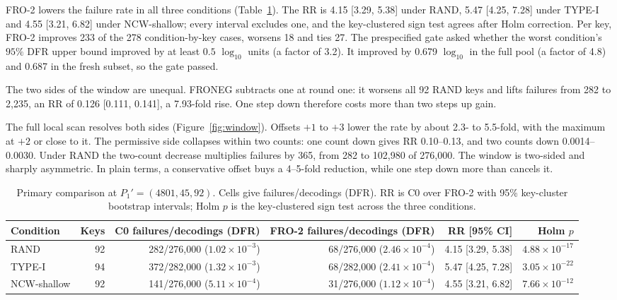 \documentclass[letterpaper,journal]{IEEEtran}
\begin{document}
FRO-2 lowers the failure rate in all three conditions (Table~\ref{tab:main}). The RR is 4.15 [3.29, 5.38] under RAND, 5.47 [4.25, 7.28] under TYPE-I and 4.55 [3.21, 6.82] under NCW-shallow; every interval excludes one, and the key-clustered sign test agrees after Holm correction. Per key, FRO-2 improves 233 of the 278 condition-by-key cases, worsens 18 and ties 27. The prespecified gate asked whether the worst condition's $95\%$ DFR upper bound improved by at least $0.5$ $\log_{10}$ units (a factor of 3.2). It improved by 0.679 $\log_{10}$ in the full pool (a factor of 4.8) and 0.687 in the fresh subset, so the gate passed.

The two sides of the window are unequal. FRONEG subtracts one at round one: it worsens all 92 RAND keys and lifts failures from 282 to 2{,}235, an RR of 0.126 [0.111, 0.141], a 7.93-fold rise. One step down therefore costs more than two steps up gain.

The full local scan resolves both sides (Figure~\ref{fig:window}). Offsets $+1$ to $+3$ lower the rate by about 2.3- to 5.5-fold, with the maximum at $+2$ or close to it. The permissive side collapses within two counts: one count down gives RR 0.10--0.13, and two counts down 0.0014--0.0030. Under RAND the two-count decrease multiplies failures by 365, from 282 to 102{,}980 of 276{,}000. The window is two-sided and sharply asymmetric. In plain terms, a conservative offset buys a 4--5-fold reduction, while one step down more than cancels it.

\begin{table}[!t]
\centering
\small
\caption{Primary comparison at $P_1'=(4801,45,92)$. Cells give failures/decodings (DFR). RR is C0 over FRO-2 with 95\% key-cluster bootstrap intervals; Holm $p$ is the key-clustered sign test across the three conditions.}
\label{tab:main}
\begin{tabular}{l r r r r r}
\toprule
Condition & Keys & C0 failures/decodings (DFR) & FRO-2 failures/decodings (DFR) & RR [95\% CI] & Holm $p$ \\
\midrule
RAND & 92 & 282/276{,}000 ($1.02\times10^{-3}$) & 68/276{,}000 ($2.46\times10^{-4}$) & 4.15 [3.29, 5.38] & $4.88\times10^{-17}$ \\
TYPE-I & 94 & 372/282{,}000 ($1.32\times10^{-3}$) & 68/282{,}000 ($2.41\times10^{-4}$) & 5.47 [4.25, 7.28] & $3.05\times10^{-22}$ \\
NCW-shallow & 92 & 141/276{,}000 ($5.11\times10^{-4}$) & 31/276{,}000 ($1.12\times10^{-4}$) & 4.55 [3.21, 6.82] & $7.66\times10^{-12}$ \\
\bottomrule
\end{tabular}
\end{table}
\end{document}
